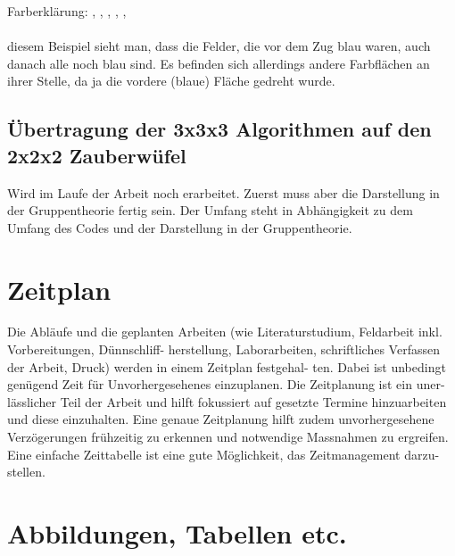 \documentclass[12pt,a4paper, usenames, dvipsnames]{scrartcl}
\begin{document}
Farberklärung: \color{gray}{weiß}, \color{blue}{blau}, \color{ForestGreen}{grün}, \color{orange}{orange}, \color{black}{gelb}, \color{red}{rot}\\
\\
\color{black}{An} diesem Beispiel sieht man, dass die Felder, die vor dem Zug blau waren, auch danach alle noch blau sind. Es befinden sich allerdings andere Farbflächen an ihrer Stelle, da ja die vordere (blaue) Fläche gedreht wurde.

\newpage

\subsection*{Übertragung der 3x3x3 Algorithmen auf den 2x2x2 Zauberwüfel}

Wird im Laufe der Arbeit noch erarbeitet. Zuerst muss aber die Darstellung in der Gruppentheorie fertig sein. Der Umfang steht in Abhängigkeit zu dem Umfang des Codes und der Darstellung in der Gruppentheorie.

\newpage


\section{Zeitplan}

\begin{footnotesize}
Die Abläufe und die geplanten Arbeiten (wie Literaturstudium, Feldarbeit inkl. Vorbereitungen, Dünnschliff-
herstellung, Laborarbeiten, schriftliches Verfassen der Arbeit, Druck) werden in einem Zeitplan festgehal-
ten. Dabei ist unbedingt genügend Zeit für Unvorhergesehenes einzuplanen. Die Zeitplanung ist ein uner-
lässlicher Teil der Arbeit und hilft fokussiert auf gesetzte Termine hinzuarbeiten und diese einzuhalten. Eine
genaue Zeitplanung hilft zudem unvorhergesehene Verzögerungen frühzeitig zu erkennen und notwendige
Massnahmen zu ergreifen. Eine einfache Zeittabelle ist eine gute Möglichkeit, das Zeitmanagement darzu-
stellen.
\end{footnotesize}


\newpage

\section{Abbildungen, Tabellen etc.}
\end{document}
